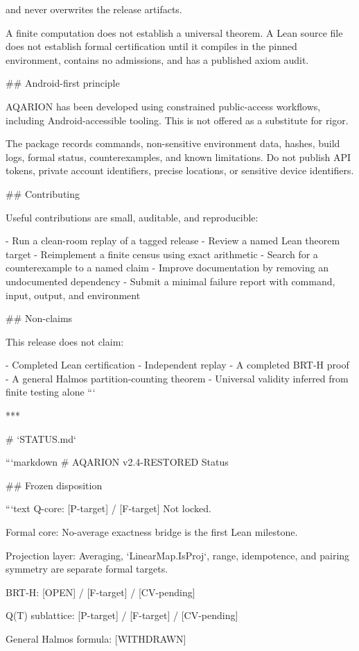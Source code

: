 and never overwrites the release artifacts.

A finite computation does not establish a universal theorem. A Lean source file does
not establish formal certification until it compiles in the pinned environment,
contains no admissions, and has a published axiom audit.

## Android-first principle

AQARION has been developed using constrained public-access workflows, including
Android-accessible tooling. This is not offered as a substitute for rigor.

The package records commands, non-sensitive environment data, hashes, build logs,
formal status, counterexamples, and known limitations. Do not publish API tokens,
private account identifiers, precise locations, or sensitive device identifiers.

## Contributing

Useful contributions are small, auditable, and reproducible:

- Run a clean-room replay of a tagged release
- Review a named Lean theorem target
- Reimplement a finite census using exact arithmetic
- Search for a counterexample to a named claim
- Improve documentation by removing an undocumented dependency
- Submit a minimal failure report with command, input, output, and environment

## Non-claims

This release does not claim:

- Completed Lean certification
- Independent replay
- A completed BRT-H proof
- A general Halmos partition-counting theorem
- Universal validity inferred from finite testing alone
```

***

# `STATUS.md`

```markdown
# AQARION v2.4-RESTORED Status

## Frozen disposition

```text
Q-core:
[P-target] / [F-target]
Not locked.

Formal core:
No-average exactness bridge is the first Lean milestone.

Projection layer:
Averaging, `LinearMap.IsProj`, range, idempotence, and pairing symmetry
are separate formal targets.

BRT-H:
[OPEN] / [F-target] / [CV-pending]

Q(T) sublattice:
[P-target] / [F-target] / [CV-pending]

General Halmos formula:
[WITHDRAWN]

